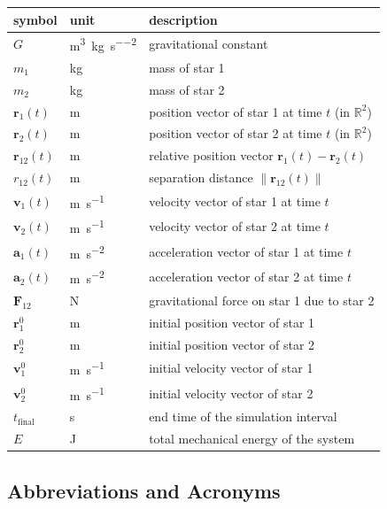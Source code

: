 \documentclass[12pt]{article}
\begin{document}
\renewcommand{\arraystretch}{1.2}
\noindent \begin{longtable*}{l l p{12cm}} \toprule
\textbf{symbol} & \textbf{unit} & \textbf{description}\\
\midrule
$G$ & \si{\metre\cubed\per\kilogram\per\second\squared} & gravitational constant \\
$m_1$ & \si{\kilogram} & mass of star 1 \\
$m_2$ & \si{\kilogram} & mass of star 2 \\
$\mathbf{r}_1(t)$ & \si{\metre} & position vector of star 1 at time $t$ (in $\mathbb{R}^2$) \\
$\mathbf{r}_2(t)$ & \si{\metre} & position vector of star 2 at time $t$ (in $\mathbb{R}^2$) \\
$\mathbf{r}_{12}(t)$ & \si{\metre} & relative position vector $\mathbf{r}_1(t)-\mathbf{r}_2(t)$ \\
$r_{12}(t)$ & \si{\metre} & separation distance $\lVert \mathbf{r}_{12}(t) \rVert$ \\
$\mathbf{v}_1(t)$ & \si{\metre\per\second} & velocity vector of star 1 at time $t$ \\
$\mathbf{v}_2(t)$ & \si{\metre\per\second} & velocity vector of star 2 at time $t$ \\
$\mathbf{a}_1(t)$ & \si{\metre\per\second\squared} & acceleration vector of star 1 at time $t$ \\
$\mathbf{a}_2(t)$ & \si{\metre\per\second\squared} & acceleration vector of star 2 at time $t$ \\
$\mathbf{F}_{12}$ & \si{\newton} & gravitational force on star 1 due to star 2 \\
$\mathbf{r}_1^0$ & \si{\metre} & initial position vector of star 1 \\
$\mathbf{r}_2^0$ & \si{\metre} & initial position vector of star 2 \\
$\mathbf{v}_1^0$ & \si{\metre\per\second} & initial velocity vector of star 1 \\
$\mathbf{v}_2^0$ & \si{\metre\per\second} & initial velocity vector of star 2 \\
$t_{\text{final}}$ & \si{\second} & end time of the simulation interval \\
$E$ & \si{\joule} & total mechanical energy of the system \\
\bottomrule
\end{longtable*}

\subsection{Abbreviations and Acronyms}
\end{document}
